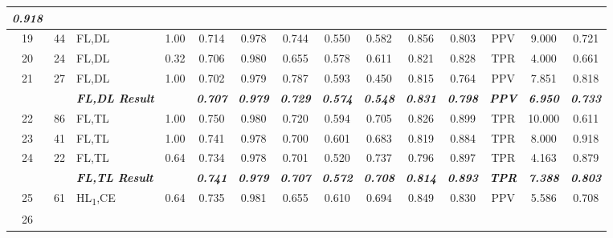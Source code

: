 \begin{table}[H]
{\begin{tabular}{cc|l|c|c|c|c|c|c|c|c|c|c|c|}
    \textit{\textbf{0.918}} \\ \hline
  \multicolumn{1}{|c|}{19} &
    44 &
    FL,DL &
    1.00 &
    0.714 &
    0.978 &
    0.744 &
    0.550 &
    0.582 &
    0.856 &
    0.803 &
    PPV &
    9.000 &
    0.721 \\ \hline
  \multicolumn{1}{|c|}{20} &
    24 &
    FL,DL &
    0.32 &
    0.706 &
    0.980 &
    0.655 &
    0.578 &
    0.611 &
    0.821 &
    0.828 &
    TPR &
    4.000 &
    0.661 \\ \hline
  \multicolumn{1}{|c|}{21} &
    27 &
    FL,DL &
    1.00 &
    0.702 &
    0.979 &
    0.787 &
    0.593 &
    0.450 &
    0.815 &
    0.764 &
    PPV &
    7.851 &
    0.818 \\ \hline
  \textit{\textbf{}} &
    \textit{\textbf{}} &
    \textit{\textbf{FL,DL Result}} &
    \textit{\textbf{}} &
    \textit{\textbf{0.707}} &
    \textit{\textbf{0.979}} &
    \textit{\textbf{0.729}} &
    \textit{\textbf{0.574}} &
    \textit{\textbf{0.548}} &
    \textit{\textbf{0.831}} &
    \textit{\textbf{0.798}} &
    \textit{\textbf{PPV}} &
    \textit{\textbf{6.950}} &
    \textit{\textbf{0.733}} \\ \hline
  \multicolumn{1}{|c|}{22} &
    86 &
    FL,TL &
    1.00 &
    0.750 &
    0.980 &
    0.720 &
    0.594 &
    0.705 &
    0.826 &
    0.899 &
    TPR &
    10.000 &
    0.611 \\ \hline
  \multicolumn{1}{|c|}{23} &
    41 &
    FL,TL &
    1.00 &
    0.741 &
    0.978 &
    0.700 &
    0.601 &
    0.683 &
    0.819 &
    0.884 &
    TPR &
    8.000 &
    0.918 \\ \hline
  \multicolumn{1}{|c|}{24} &
    22 &
    FL,TL &
    0.64 &
    0.734 &
    0.978 &
    0.701 &
    0.520 &
    0.737 &
    0.796 &
    0.897 &
    TPR &
    4.163 &
    0.879 \\ \hline
  \textit{\textbf{}} &
    \textit{\textbf{}} &
    \textit{\textbf{FL,TL Result}} &
    \textit{\textbf{}} &
    \textit{\textbf{0.741}} &
    \textit{\textbf{0.979}} &
    \textit{\textbf{0.707}} &
    \textit{\textbf{0.572}} &
    \textit{\textbf{0.708}} &
    \textit{\textbf{0.814}} &
    \textit{\textbf{0.893}} &
    \textit{\textbf{TPR}} &
    \textit{\textbf{7.388}} &
    \textit{\textbf{0.803}} \\ \hline
  \multicolumn{1}{|c|}{25} &
    61 &
    HL\textsubscript{1},CE &
    0.64 &
    0.735 &
    0.981 &
    0.655 &
    0.610 &
    0.694 &
    0.849 &
    0.830 &
    PPV &
    5.586 &
    0.708 \\ \hline
  \multicolumn{1}{|c|}{26} &

\end{tabular}}
\end{table}
